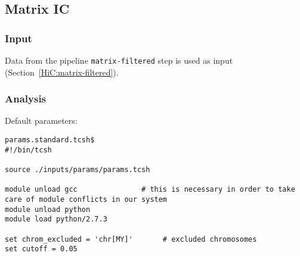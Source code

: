 \subsection{Matrix IC}\label{HiC:matrix-ic} %
\subsubsection{Input} %
Data from the pipeline \texttt{matrix-filtered} step is used as input (Section~\ref{HiC:matrix-filtered}).
\subsubsection{Analysis} %
Default parameters:
\begin{lstlisting}
params.standard.tcsh$
#!/bin/tcsh

source ./inputs/params/params.tcsh

module unload gcc               # this is necessary in order to take care of module conflicts in our system
module unload python
module load python/2.7.3

set chrom_excluded = 'chr[MY]'       # excluded chromosomes
set cutoff = 0.05
\end{lstlisting}


